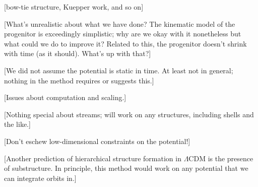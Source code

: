 \documentclass[letterpaper,12pt,preprint]{aastex}
\begin{document}
[bow-tie structure, Kuepper work, and so on]

[What's unrealistic about what we have done?  The kinematic model of
  the progenitor is exceedingly simplistic; why are we okay with it
  nonetheless but what could we do to improve it?  Related to this,
  the progenitor doesn't shrink with time (as it should).  What's up
  with that?]

[We did not assume the potential is static in time.  At least not in
  general; nothing in the method requires or suggests this.]

[Issues about computation and scaling.]

[Nothing special about streams; will work on any structures, including
  shells and the like.]

[Don't eschew low-dimensional constraints on the potential!]

[Another prediction of hierarchical structure formation in $\Lambda$CDM is the presence of substructure. In principle, this method would work on any potential that we can integrate orbits in.]




\acknowledgements
\end{document}
